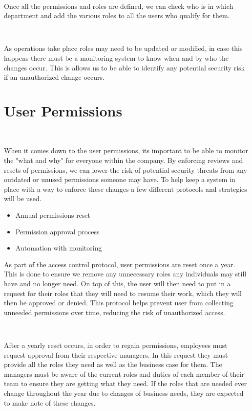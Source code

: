 \documentclass[12pt,a4paper]{report}
\begin{document}
\

Once all the permissions and roles are defined, we can check who is in which department and add the various roles to all the users who qualify for them.

\

As operations take place roles may need to be updated or modified, in case this happens there must be a monitoring system to know when and by who the changes occur. 
This is allows us to be able to identify any potential security risk if an unauthorized change occurs.

\section{User Permissions}
\

When it comes down to the user permissions, its important to be able to monitor the "what and why" for everyone within the company.
By enforcing reviews and resets of permissions, we can lower the risk of potential security threats from any outdated or unused permissions someone may have.
To help keep a system in place with a way to enforce these changes a few different protocols and strategies will be used.
\begin{itemize}
 \item Annual permissions reset
 \item Permission approval process
 \item Automation with monitoring
\end{itemize}

As part of the access control protocol, user permissions are reset once a year.
This is done to ensure we remove any unnecessary roles any individuals may still have and no longer need.
On top of this, the user will then need to put in a request for their roles that they will need to resume their work, which they will then be approved or denied.
This protocol helps prevent user from collecting unneeded permissions over time, reducing the risk of unauthorized access.

\

After a yearly reset occurs, in order to regain permissions, employees must request approval from their respective managers.
In this request they must provide all the roles they need as well as the business case for them.
The managers must be aware of the current roles and duties of each member of their team to ensure they are getting what they need.
If the roles that are needed ever change throughout the year due to changes of business needs, they are expected to make note of these changes.
\end{document}
